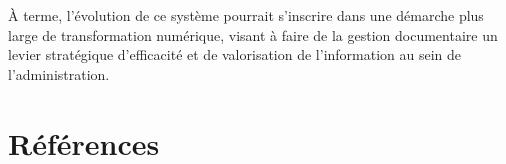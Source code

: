\documentclass[12pt,a4paper]{report}
\begin{document}
À terme, l’évolution de ce système pourrait s’inscrire dans une démarche plus large de transformation numérique, visant à faire de la gestion documentaire un levier stratégique d’efficacité et de valorisation de l’information au sein de l’administration.

\chapter*{Références}
\end{document}
